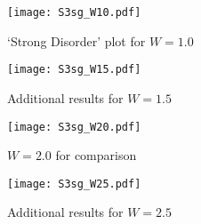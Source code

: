\documentclass[prb,aps, twocolumn, superscriptaddress]{revtex4-1}
\begin{document}
\begin{appendix}
\begin{figure}[t!]
\caption{`Strong Disorder' plot for $W=1.0$}{
\texttt{[image: S3sg\_W10.pdf]}
\label{fig:subfig1sg}}
\end{figure}


\begin{figure}[t!]
\caption{Additional results for $W=1.5$}{
\texttt{[image: S3sg\_W15.pdf]}
\label{fig:subfig2sg}}
\end{figure}

\begin{figure}[H]
\caption{$W=2.0$ for comparison}{
\texttt{[image: S3sg\_W20.pdf]}
\label{fig:subfig3sg}}
\end{figure}




\begin{figure}[H]
\caption{Additional results for $W=2.5$}{
\texttt{[image: S3sg\_W25.pdf]}
\label{fig:subfig4sg}}
\end{figure}





\end{appendix}

\end{document}
